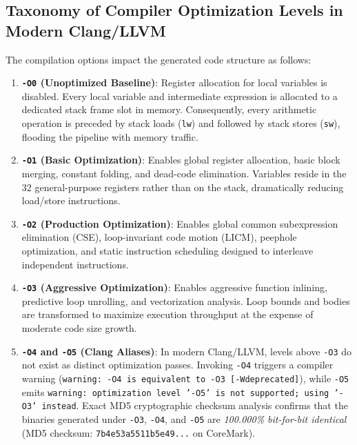 \subsection{Taxonomy of Compiler Optimization Levels in Modern Clang/LLVM}
The compilation options impact the generated code structure as follows:
\begin{enumerate}
    \item \textbf{\texttt{-O0} (Unoptimized Baseline)}:
    Register allocation for local variables is disabled. Every local variable and intermediate expression is allocated to a dedicated stack frame slot in memory. Consequently, every arithmetic operation is preceded by stack loads (\texttt{lw}) and followed by stack stores (\texttt{sw}), flooding the pipeline with memory traffic.
    
    \item \textbf{\texttt{-O1} (Basic Optimization)}:
    Enables global register allocation, basic block merging, constant folding, and dead-code elimination. Variables reside in the 32 general-purpose registers rather than on the stack, dramatically reducing load/store instructions.
    
    \item \textbf{\texttt{-O2} (Production Optimization)}:
    Enables global common subexpression elimination (CSE), loop-invariant code motion (LICM), peephole optimization, and static instruction scheduling designed to interleave independent instructions.
    
    \item \textbf{\texttt{-O3} (Aggressive Optimization)}:
    Enables aggressive function inlining, predictive loop unrolling, and vectorization analysis. Loop bounds and bodies are transformed to maximize execution throughput at the expense of moderate code size growth.
    
    \item \textbf{\texttt{-O4} and \texttt{-O5} (Clang Aliases)}:
    In modern Clang/LLVM, levels above \texttt{-O3} do not exist as distinct optimization passes. Invoking \texttt{-O4} triggers a compiler warning (\texttt{warning: -O4 is equivalent to -O3 [-Wdeprecated]}), while \texttt{-O5} emits \texttt{warning: optimization level '-O5' is not supported; using '-O3' instead}. Exact MD5 cryptographic checksum analysis confirms that the binaries generated under \texttt{-O3}, \texttt{-O4}, and \texttt{-O5} are \textit{100.000\% bit-for-bit identical} (MD5 checksum: \texttt{7b4e53a5511b5e49...} on CoreMark).
    

\end{enumerate}

